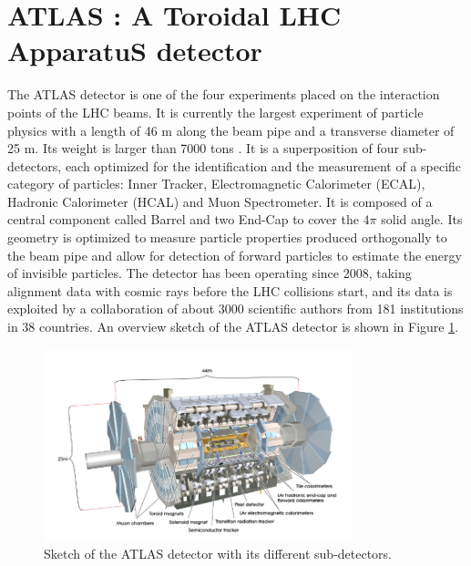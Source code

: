 \section{ATLAS : A Toroidal LHC ApparatuS detector}
\label{chap2:ATLAS}
The ATLAS detector is one of the four experiments placed on the interaction points of the LHC beams. It is currently the largest experiment of particle physics with a length of 46 m along the beam pipe and a transverse diameter of 25 m. Its weight is larger than 7000 tons \cite{ATLAS_Exp}. It is a superposition of four sub-detectors, each optimized for the identification and the measurement of a specific category of particles: Inner Tracker, Electromagnetic Calorimeter (ECAL), Hadronic Calorimeter (HCAL) and Muon Spectrometer. It is composed of a central component called Barrel and two End-Cap to cover the $4\pi$ solid angle. Its geometry is optimized to measure particle properties produced orthogonally to the beam pipe and allow for detection of forward particles to estimate the energy of invisible particles. The detector has been operating since 2008, taking alignment data with cosmic rays before the LHC collisions start, and its data is exploited by a collaboration of about 3000 scientific authors from 181 institutions in 38 countries. An overview sketch of the ATLAS detector is shown in Figure \ref{fig:chap2:ATLAS:Img}.
\begin{figure}[htbp]
    \centering
    \includegraphics[width=0.8\textwidth]{Ch2/Img/ATLAS_sketch.png}
    \caption{Sketch of the ATLAS detector with its different sub-detectors.}
    \label{fig:chap2:ATLAS:Img}
\end{figure}

